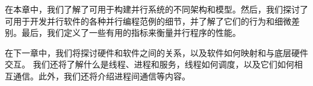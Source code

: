 在本章中，我们了解了可用于构建并行系统的不同架构和模型。然后，我们探讨了可用于开发并行软件的各种并行编程范例的细节，并了解了它们的行为和细微差别。最后，我们定义了一些有用的指标来衡量并行程序的性能。

在下一章中，我们将探讨硬件和软件之间的关系，以及软件如何映射和与底层硬件交互。
我们还将了解什么是线程、进程和服务，线程如何调度，以及它们如何相互通信。此外，我们还将介绍进程间通信等内容。
